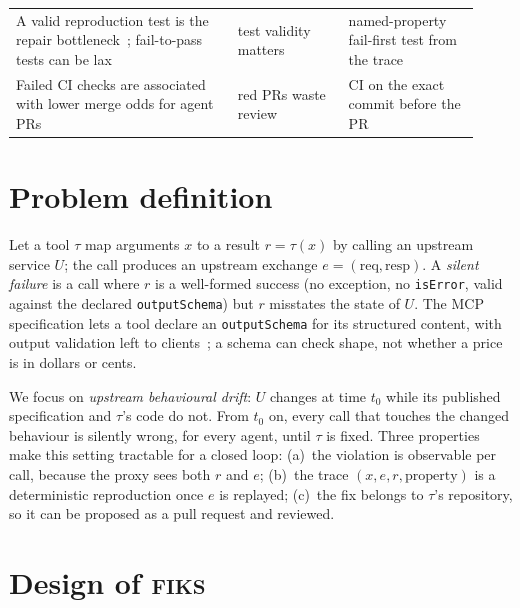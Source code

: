 \documentclass[10pt]{article}
\newcommand{\fiks}{\textsc{fiks}}
\begin{document}
\begin{table}[t]
\begin{tabular}{>{\raggedright\arraybackslash}p{0.44\linewidth}>{\raggedright\arraybackslash}p{0.22\linewidth}>{\raggedright\arraybackslash}p{0.26\linewidth}}
A valid reproduction test is the repair bottleneck~\cite{tdflow}; fail-to-pass tests can be lax~\cite{tan2026coharden} & test validity matters & named-property fail-first test from the trace \\
Failed CI checks are associated with lower merge odds for agent PRs~\cite{ehsani2026failedagenticprs} & red PRs waste review & CI on the exact commit before the PR \\
\bottomrule
\end{tabular}
\end{table}

\section{Problem definition}
\label{sec:problem}

Let a tool $\tau$ map arguments $x$ to a result $r=\tau(x)$ by calling an upstream service $U$; the call produces an upstream exchange $e=(\mathrm{req},\mathrm{resp})$.
A \emph{silent failure} is a call where $r$ is a well-formed success (no exception, no \texttt{isError}, valid against the declared \texttt{outputSchema}) but $r$ misstates the state of $U$.
The MCP specification lets a tool declare an \texttt{outputSchema} for its structured content, with output validation left to clients~\cite{mcp-spec-2026-07-28-tools}; a schema can check shape, not whether a price is in dollars or cents.

We focus on \emph{upstream behavioural drift}: $U$ changes at time $t_0$ while its published specification and $\tau$'s code do not.
From $t_0$ on, every call that touches the changed behaviour is silently wrong, for every agent, until $\tau$ is fixed.
Three properties make this setting tractable for a closed loop:
(a)~the violation is observable per call, because the proxy sees both $r$ and $e$;
(b)~the trace $(x, e, r, \text{property})$ is a deterministic reproduction once $e$ is replayed;
(c)~the fix belongs to $\tau$'s repository, so it can be proposed as a pull request and reviewed.

\section{Design of \fiks}
\label{sec:design}
\end{document}
